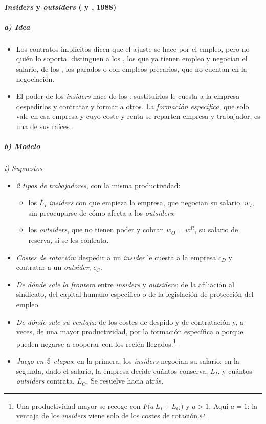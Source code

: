 \documentclass[11pt]{article}
\begin{document}
\paragraph{\emph{Insiders} y \emph{outsiders} ( y , 1988)}

\subparagraph{a) Idea}

\begin{itemize}
\item Los contratos implícitos dicen que el ajuste se hace por el empleo, pero no quién lo soporta. \textcite{LindbeckSnower1988Insider} distinguen a los , los que ya tienen empleo y negocian el salario, de los , los parados o con empleos precarios, que no cuentan en la negociación\nocite{LindbeckSnower1986Wage}.
\item El poder de los \emph{insiders} nace de los : sustituirlos le cuesta a la empresa despedirlos y contratar y formar a otros. La \emph{formación específica}, que solo vale en esa empresa y cuyo coste y renta se reparten empresa y trabajador, es una de sus raíces .
\end{itemize}

\subparagraph{b) Modelo}

\hspace*{3.6em}\emph{i) Supuestos}

\begin{itemize}
\item \emph{2 tipos de trabajadores}, con la misma productividad:
  \begin{itemize}
  \item los $\overline{L}_I$ \emph{insiders} con que empieza la empresa, que negocian su salario, $w_I$, sin preocuparse de cómo afecta a los \emph{outsiders};
  \item los \emph{outsiders}, que no tienen poder y cobran $w_O=w^R$, su salario de reserva, si se les contrata.
  \end{itemize}
\item \emph{Costes de rotación}: despedir a un \emph{insider} le cuesta a la empresa $c_D$ y contratar a un \emph{outsider}, $c_C$.
\item \emph{De dónde sale la frontera} entre \emph{insiders} y \emph{outsiders}: de la afiliación al sindicato, del capital humano específico o de la legislación de protección del empleo.
\item \emph{De dónde sale su ventaja}: de los costes de despido y de contratación y, a veces, de una mayor productividad, por la formación específica o porque pueden negarse a cooperar con los recién llegados.\footnote{Una productividad mayor se recoge con $F\big(a\,L_I+L_O\big)$ y $a>1$. Aquí $a=1$: la ventaja de los \emph{insiders} viene solo de los costes de rotación.}
\item \emph{Juego en 2~etapas}: en la primera, los \emph{insiders} negocian su salario; en la segunda, dado el salario, la empresa decide cuántos conserva, $L_I$, y cuántos \emph{outsiders} contrata, $L_O$. Se resuelve hacia atrás.
\end{itemize}
\end{document}
